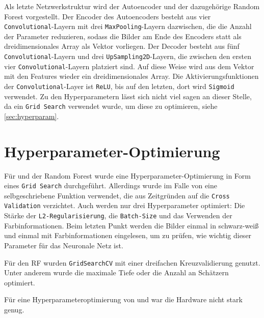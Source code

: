 Als letzte Netzwerkstruktur wird der Autoencoder und der dazugehörige Random
Forest vorgestellt. Der Encoder des Autoencoders besteht aus vier
\texttt{Convolutional}-Layern mit drei \texttt{MaxPooling}-Layern dazwischen,
die die Anzahl der Parameter reduzieren, sodass die Bilder am Ende des Encoders
statt als dreidimensionales Array als Vektor vorliegen. Der Decoder besteht aus
fünf \texttt{Convolutional}-Layern und drei \texttt{UpSampling2D}-Layern, die
zwischen den ersten vier \texttt{Convolutional}-Layern platziert sind. Auf diese
Weise wird aus dem Vektor mit den Features wieder ein dreidimensionales Array.
Die Aktivierungsfunktionen der \texttt{Convolutional}-Layer ist \texttt{ReLU},
bis auf den letzten, dort wird \texttt{Sigmoid} verwendet. Zu den
Hyperparametern lässt sich nicht viel sagen an dieser Stelle, da ein
\texttt{Grid Search} verwendet wurde, um diese zu optimieren, siehe
\autoref{sec:hyperparam}.

\section{Hyperparameter-Optimierung}
\label{sec:hyperparam}
Für \MiniDog und der Random Forest wurde eine Hyperparameter-Optimierung in Form
eines \texttt{Grid Search} durchgeführt. Allerdings wurde im Falle von \MiniDog
eine selbgeschriebene Funktion verwendet, die aus Zeitgründen auf die
\texttt{Cross Validation} verzichtet. Auch werden nur drei Hyperparameter
optimiert: Die Stärke der \texttt{L2-Re\-gu\-la\-ri\-sier\-ung}, die
\texttt{Batch-Size} und das Verwenden der Farbinformationen. Beim letzten Punkt
werden die Bilder einmal in schwarz-weiß und einmal mit Farbinformationen
eingelesen, um zu prüfen, wie wichtig dieser Parameter für das Neuronale Netz
ist.

Für den RF wurden \texttt{GridSearchCV} mit einer dreifachen Kreuzvalidierung genutzt.
Unter anderem wurde die maximale Tiefe oder die Anzahl an Schätzern optimiert.


Für eine Hyperparameteroptimierung von \PreBig und \PreDog war die Hardware nicht stark genug.
